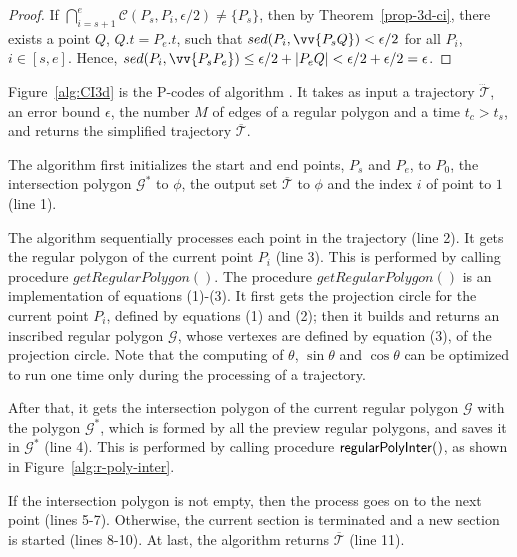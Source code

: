 \begin{proof}
If $\bigcap_{i=s+1}^{e}{\mathcal{C}(P_s, P_i, \epsilon/2)} \ne \{P_s\}$, then by Theorem~\ref{prop-3d-ci}, there exists a point $Q$, $Q.t = P_e.t$, such that $sed(P_i, \vv{P_sQ})<\epsilon/2$ for all $P_i$, $i \in [s,e]$. Hence, $sed(P_i, \vv{P_sP_e})\le \epsilon/2 + |P_eQ| < \epsilon/2 + \epsilon/2 = \epsilon$.
\end{proof}



Figure~\ref{alg:CI3d} is the P-codes of algorithm \cist. It takes as input a trajectory $\dddot{\mathcal{T}}$, an error bound $\epsilon$, the number $M$ of edges of a regular polygon and a time $t_c>t_s$, and returns the simplified trajectory $\overline{\mathcal{T}}$.

The algorithm first initializes the start and end points, $P_s$ and $P_e$, to $P_0$, the intersection polygon $\mathcal{G}^*$ to $\phi$, the output set $\overline{\mathcal{T}}$ to $\phi$ and the index $i$ of point to $1$ (line 1).

The algorithm sequentially processes each point in the trajectory (line 2).
It gets the regular polygon of the current point $P_i$ (line 3).
This is performed by calling procedure $getRegularPolygon()$. The procedure $getRegularPolygon()$ is an implementation of equations (1)-(3). It first gets the projection circle for the current point $P_i$, defined by equations (1) and (2); then it builds and returns an inscribed regular polygon $\mathcal{G}$, whose vertexes are defined by equation (3), of the projection circle.
Note that the computing of $\theta$, $\sin\theta$ and $\cos\theta$ can be optimized to run one time only during the processing of a trajectory.

After that, it gets the intersection polygon of the current regular polygon $\mathcal{G}$ with the polygon $\mathcal{G}^*$, which is formed by all the preview regular polygons, and saves it in $\mathcal{G}^*$ (line 4).
This is performed by calling procedure ${\mathsf{regularPolyInter}}()$, as shown in Figure~\ref{alg:r-poly-inter}.

If the intersection polygon is not empty, then the process goes on to the next point (lines 5-7).
Otherwise, the current section is terminated and a new section is started (lines 8-10).
%
At last, the algorithm returns $\overline{\mathcal{T}}$ (line 11).


